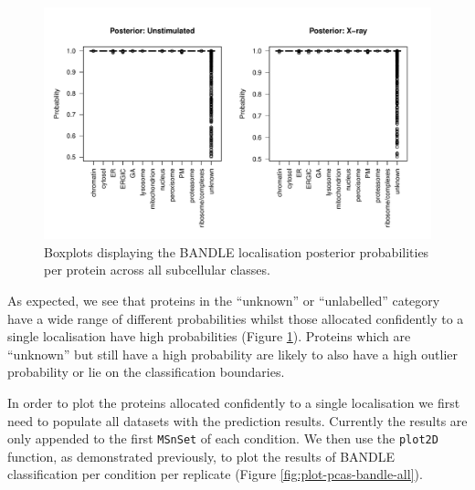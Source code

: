 \documentclass[9pt,a4paper,]{extarticle}
\begin{document}
\begin{figure}[H]

{\centering \includegraphics[width=0.9\linewidth,]{figs/bandle_posteriors} 

}

\caption{Boxplots displaying the BANDLE localisation posterior probabilities per protein across all subcellular classes.}\label{fig:bandle-posterior-boxplot}
\end{figure}

As expected, we see that proteins in the ``unknown'' or ``unlabelled'' category have
a wide range of different probabilities whilst those allocated confidently to a
single localisation have high probabilities (Figure \ref{fig:bandle-posterior-boxplot}). Proteins which are ``unknown'' but
still have a high probability are likely to also have a high outlier probability
or lie on the classification boundaries.

In order to plot the proteins allocated confidently to a single localisation we
first need to populate all datasets with the prediction results. Currently the
results are only appended to the first \texttt{MSnSet} of each condition. We then use
the \texttt{plot2D} function, as demonstrated previously, to plot the results of BANDLE
classification per condition per replicate (Figure \ref{fig:plot-pcas-bandle-all}).
\end{document}
